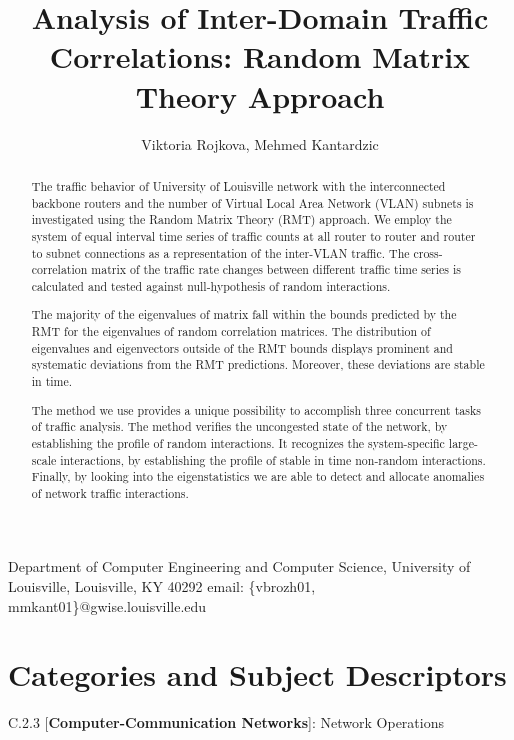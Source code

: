 \documentclass{IEEEtran}
\newcommand{\lyxaddress}[1]{
   \par {\raggedright #1 
   \vspace{1.4em}
   \noindent\par}
 }
\begin{document}
\title{Analysis of Inter-Domain Traffic Correlations: Random Matrix Theory
Approach}


\author{Viktoria Rojkova, Mehmed Kantardzic}

\maketitle

\lyxaddress{Department of Computer Engineering and Computer Science, University
of Louisville, Louisville, KY 40292 email: \{vbrozh01, mmkant01\}@gwise.louisville.edu }

\begin{abstract}
The traffic behavior of University of Louisville network with the
interconnected backbone routers and the number of Virtual Local Area
Network (VLAN) subnets is investigated using the Random Matrix Theory
(RMT) approach. We employ the system of equal interval time series
of traffic counts at all router to router and router to subnet connections
as a representation of the inter-VLAN traffic. The cross-correlation
matrix  of the traffic rate changes between different traffic
time series is calculated and tested against null-hypothesis of random
interactions. 

The majority of the eigenvalues  of matrix  fall
within the bounds predicted by the RMT for the eigenvalues of random
correlation matrices. The distribution of eigenvalues and eigenvectors
outside of the RMT bounds displays prominent and systematic deviations
from the RMT predictions. Moreover, these deviations are stable in
time. 

The method we use provides a unique possibility to accomplish three
concurrent tasks of traffic analysis. The method verifies the uncongested
state of the network, by establishing the profile of random interactions.
It recognizes the system-specific large-scale interactions, by establishing
the profile of stable in time non-random interactions. Finally, by
looking into the eigenstatistics we are able to detect and allocate
anomalies of network traffic interactions.
\end{abstract}

\section*{Categories and Subject Descriptors}

C.2.3 {[}\textbf{Computer-Communication Networks}{]}: Network Operations
\end{document}
